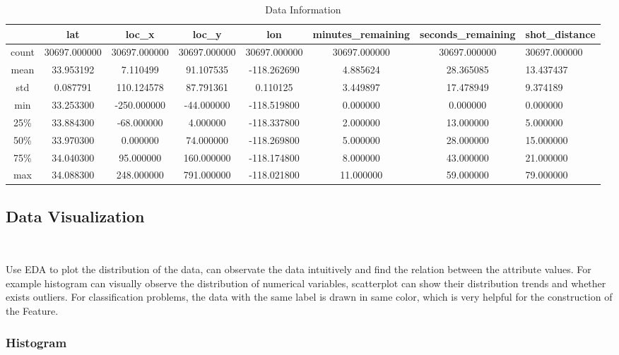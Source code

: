 \begin{table}[htbp]  \centering
	\caption{Data Information}
	\label{tbl:data information}		
	\begin{tabular}{ccccccc}
		\hline
		& lat & loc\_x & loc\_y & lon & minutes\_remaining & seconds\_remaining & shot\_distance\\
		\hline
		count & 30697.000000 & 30697.000000 & 30697.000000 & 30697.000000 & 30697.000000 & 30697.000000 & 30697.000000 \\
		mean & 33.953192 & 7.110499	& 91.107535 & -118.262690 & 4.885624 & 28.365085 & 13.437437 \\
		std & 0.087791	& 110.124578 & 87.791361 & 0.110125	& 3.449897 & 17.478949 & 9.374189 \\
		min & 33.253300	& -250.000000 & -44.000000 & -118.519800 & 0.000000	& 0.000000 & 0.000000 \\
		25\% & 33.884300 & -68.000000 & 4.000000 & -118.337800 & 2.000000 & 13.000000 & 5.000000 \\
		50\% & 33.970300 & 0.000000	& 74.000000	& -118.269800	& 5.000000	& 28.000000	& 15.000000\\
		75\% & 34.040300 & 95.000000 & 160.000000 & -118.174800 & 8.000000 & 43.000000 & 21.000000\\
		max & 34.088300 & 248.000000 & 791.000000 & -118.021800 & 11.000000 & 59.000000 & 79.000000\\
		\hline 
	\end{tabular}
\end{table}


\subsection{Data Visualization}
\

Use EDA to plot the distribution of the data,
can observate the data intuitively and
find the relation between the attribute values. 
For example histogram can visually observe 
the distribution of numerical variables, 
scatterplot can show their distribution trends 
and whether exists outliers.
For classification problems, 
the data with the same label is drawn in same color, 
which is very helpful for 
the construction of the Feature.


\subsubsection{ Histogram}
\

